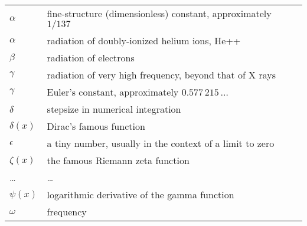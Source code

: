
\begin{tabular}{ll}
    \hline
    $\alpha$      & fine-structure (dimensionless) constant, approximately $1 / 137$ \\
    $\alpha$      & radiation of doubly-ionized helium ions, He++ \\
    $\beta$       & radiation of electrons \\
    $\gamma$      & radiation of very high frequency, beyond that of X rays \\
    $\gamma$      & Euler's constant, approximately $0.577\,215\,\ldots{}$  \\
    $\delta$      & stepsize in numerical integration \\
    $\delta(x)$   & Dirac's famous function \\
    $\epsilon$    & a tiny number, usually in the context of a limit to zero \\
    $\zeta(x)$    & the famous Riemann zeta function \\
    \ldots{}      & \ldots{}  \\
    $\psi(x)$     & logarithmic derivative of the gamma function \\
    $\omega$      & frequency \\
    \hline
\end{tabular}

